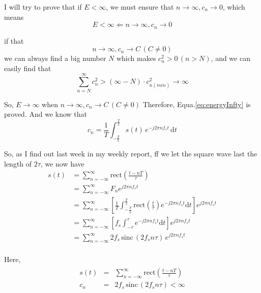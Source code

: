 \documentclass{article}
\begin{document}
I will try to prove that if $E < \infty$, we must ensure that $n \to \infty, c_n \to 0$, which means 
\begin{equation}
E < \infty \Leftarrow  n \to \infty, c_n \to 0
\label{eq:energyInfty}
\end{equation}

if that
$$
n  \to \infty, c_n \to C \, (C \neq 0)
$$
we can always find a big number $N$ which makes $c_n^2 > 0 \, (n > N) $, and we can easily find that
$$
\sum_{n = N}^{\infty} c_n^2 > (\infty - N) \cdot c^2_{n(min)} \to \infty
$$

So, $E\to \infty$ when $n  \to \infty, c_n \to C \, (C \neq 0)$
Therefore, Equa.\ref{eq:energyInfty} is proved.
And we know that
\begin{equation}
    c_n = \frac{1}{T} \int_{-\frac{T}{2}}^{\frac{T}{2}} s(t) \, e^{-j2\pi n f_s t} \, \mathrm{d}t
\end{equation}

So, as I find out last week in my weekly report, ff we let the square wave last the length of $2\tau$, we now have
\begin{equation}
    \begin{aligned} s(t) & = \sum_{n = -\infty}^{\infty} \mathrm{rect} (\frac{t - nT}{\tau}) \\
             & = \sum_{n =-\infty}^{\infty}F_n e^{j2 \pi n f_s t}  \\
             & = \sum_{n = -\infty}^{\infty}\left[ \frac{1}{T} \int_{-\frac T2}^{\frac T2}
              \mathrm{rect}(\frac{t}{\tau}) e^{-j2 \pi n f_s t} \mathrm{d}t \right] e^{j2 \pi n f_s t} \\
             & = \sum_{n = -\infty}^{\infty}\left[ f_s \int_{-\tau}^{\tau} e^{-j2 \pi n f_s t} \mathrm{d}t \right] e^{j2 \pi n f_s t}  \\
             & = \sum_{n = -\infty}^{\infty}2f_s\, \mathrm{sinc} \,( 2f_s n\tau)\, e^{j2 \pi n f_s t} \\
             \label{eq:samplingSquare}
    \end{aligned}
\end{equation}

Here, 
\begin{align*}
\begin{array}{lrl}
s(t) &=& \sum_{n = -\infty}^{\infty} \mathrm{rect} (\frac{t - nT}{\tau}) \\ 
c_n  &=& 2f_s\, \mathrm{sinc} \,( 2f_s n\tau) < \infty
\end{array}
\end{align*}  
\end{document}
